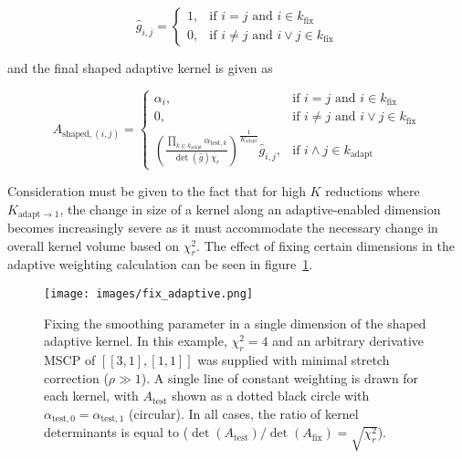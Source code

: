 \begin{equation}
    {\hat{g}}_{i, j} = \begin{cases}
        1,& \textrm{if } i = j \textrm{ and } i \in k_{\text{fix}} \\
        0,& \textrm{if } i \neq j \textrm{ and } i \lor j \in k_{\text{fix}}
    \end{cases}
    \label{eq:equation66}
\end{equation}

and the final shaped adaptive kernel is given as

\begin{equation}
    A_{\text{shaped}, (i,j)} = \begin{cases}
        \alpha_i, & \textrm{if } i=j \textrm{ and } i \in k_{\text{fix}} \\
        0,& \textrm{if } i \neq j \textrm{ and } i \lor j \in k_{\text{fix}} \\
        \left(
            \frac{\prod_{k \in k_{\text{adapt}}}{\alpha_{\text{test},k}}}
                 {\det(\hat{g}) \chi_r}
        \right)^{\frac{1}{K_{\text{adapt}}}} {\hat{g}}_{i, j},
        & \textrm{if } i \land j \in k_{\text{adapt}}
    \end{cases}
    \label{eq:equation67}
\end{equation}

Consideration must be given to the fact that for high $K$ reductions where
$K_{\text{adapt} \to 1}$, the change in size of a kernel along an
adaptive-enabled dimension becomes increasingly severe as it must accommodate
the necessary change in overall kernel volume based on $\chi_r^2$.
The effect of fixing certain dimensions in the adaptive weighting calculation
can be seen in figure~\ref{fig:fix-adaptive}.

\begin{figure}[H]
  \begin{center}
  \texttt{[image: images/fix\_adaptive.png]}
  \caption{Fixing the smoothing parameter in a single dimension of the
  shaped adaptive kernel.  In this example, $\chi_r^2=4$ and an arbitrary
  derivative MSCP of $[[3, 1], [1, 1]]$ was supplied with minimal stretch
  correction ($\rho \gg 1$).  A single line of constant weighting is drawn for
  each kernel, with $A_{\text{test}}$ shown as a dotted black circle with
  $\alpha_{\text{test}, 0} = \alpha_{\text{test}, 1}$ (circular).  In all
  cases, the ratio of kernel determinants is equal to
  ($\det(A_{\text{test}}) / \det(A_{\text{fix}}) = \sqrt{\chi_r^2}$).}
  \label{fig:fix-adaptive}
  \end{center}
\end{figure}
